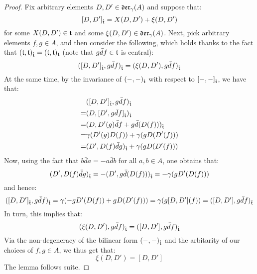             \begin{proof}
                Fix arbitrary elements $D, D' \in \mathfrak{der}_{\gamma}(A)$ and suppose that:
                    $$[D, D']_{\hat{\mathfrak{t}}} = X(D, D') + \xi(D, D')$$
                for some $X(D, D') \in \mathfrak{t}$ and some $\xi(D, D') \in \mathfrak{der}_{\gamma}(A)$. Next, pick arbitrary elements $f, g \in A$, and then consider the following, which holds thanks to the fact that $(\mathfrak{t}, \mathfrak{t})_{\hat{\mathfrak{t}}} = (\mathfrak{t}, \mathfrak{t})_{\mathfrak{t}}$ (note that $g \bar{d}f \in \mathfrak{t}$ is central):
                    $$( [D, D']_{\hat{\mathfrak{t}}}, g \bar{d}f )_{\hat{\mathfrak{t}}} = ( \xi(D, D'), g \bar{d}f )_{\hat{\mathfrak{t}}}$$
                At the same time, by the invariance of $(-, -)_{\hat{\mathfrak{t}}}$ with respect to $[-, -]_{\hat{\mathfrak{t}}}$, we have that:
                    $$
                        \begin{aligned}
                            & ( [D, D']_{\hat{\mathfrak{t}}}, g \bar{d}f )_{\hat{\mathfrak{t}}}
                            \\
                            = & ( D, [D', g \bar{d}f]_{\hat{\mathfrak{t}}} )_{\hat{\mathfrak{t}}}
                            \\
                            = & ( D, D'(g) \bar{d}f + g \bar{d}(D(f)) )_{\hat{\mathfrak{t}}}
                            \\
                            = & \gamma( D'(g) D(f) ) + \gamma( g D(D'(f)) )
                            \\
                            = & ( D', D(f) \bar{d}g )_{\hat{\mathfrak{t}}} + \gamma( g D(D'(f)) )
                        \end{aligned}
                    $$
                Now, using the fact that $b\bar{d}a = -a \bar{d}b$ for all $a, b \in A$, one obtains that:
                    $$( D', D(f) \bar{d}g )_{\hat{\mathfrak{t}}} = -( D', g \bar{d}(D(f)) )_{\hat{\mathfrak{t}}} = -\gamma( g D'(D(f)) )$$
                and hence:
                    $$( [D, D']_{\hat{\mathfrak{t}}}, g \bar{d}f )_{\hat{\mathfrak{t}}} = \gamma( -g D'(D(f)) + g D(D'(f)) ) = \gamma( g[D, D'](f) ) = ([D, D'], g\bar{d}f)_{\hat{\mathfrak{t}}}$$
                In turn, this implies that:
                    $$( \xi(D, D'), g \bar{d}f )_{\hat{\mathfrak{t}}} = ([D, D'], g\bar{d}f)_{\hat{\mathfrak{t}}}$$
                Via the non-degeneracy of the bilinear form $(-, -)_{\hat{\mathfrak{t}}}$ and the arbitarity of our choices of $f, g \in A$, we thus get that:
                    $$\xi(D, D') = [D, D']$$
                The lemma follows suite.
            \end{proof}
